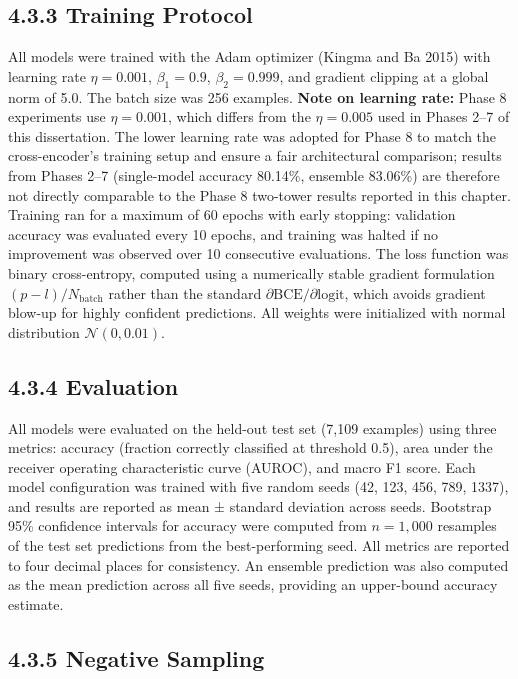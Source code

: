 \documentclass[
  12pt,
]{report}
\begin{document}
\subsection{4.3.3 Training Protocol}\label{training-protocol}

All models were trained with the Adam optimizer (Kingma and Ba 2015)
with learning rate \(\eta = 0.001\), \(\beta_1 = 0.9\),
\(\beta_2 = 0.999\), and gradient clipping at a global norm of 5.0. The
batch size was 256 examples. \textbf{Note on learning rate:} Phase 8
experiments use \(\eta = 0.001\), which differs from the
\(\eta = 0.005\) used in Phases 2--7 of this dissertation. The lower
learning rate was adopted for Phase 8 to match the cross-encoder's
training setup and ensure a fair architectural comparison; results from
Phases 2--7 (single-model accuracy 80.14\%, ensemble 83.06\%) are
therefore not directly comparable to the Phase 8 two-tower results
reported in this chapter. Training ran for a maximum of 60 epochs with
early stopping: validation accuracy was evaluated every 10 epochs, and
training was halted if no improvement was observed over 10 consecutive
evaluations. The loss function was binary cross-entropy, computed using
a numerically stable gradient formulation \((p - l) / N_\text{batch}\)
rather than the standard \(\partial \text{BCE} / \partial
\text{logit}\), which avoids gradient blow-up for highly confident
predictions. All weights were initialized with normal distribution
\(\mathcal{N}(0, 0.01)\).

\subsection{4.3.4 Evaluation}\label{evaluation}

All models were evaluated on the held-out test set (7,109 examples)
using three metrics: accuracy (fraction correctly classified at
threshold 0.5), area under the receiver operating characteristic curve
(AUROC), and macro F1 score. Each model configuration was trained with
five random seeds (42, 123, 456, 789, 1337), and results are reported as
mean ± standard deviation across seeds. Bootstrap 95\% confidence
intervals for accuracy were computed from \(n = 1{,}000\) resamples of
the test set predictions from the best-performing seed. All metrics are
reported to four decimal places for consistency. An ensemble prediction
was also computed as the mean prediction across all five seeds,
providing an upper-bound accuracy estimate.

\subsection{4.3.5 Negative Sampling}\label{negative-sampling}
\end{document}
